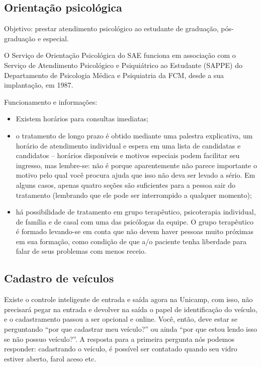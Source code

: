 \subsection{Orientação psicológica}

Objetivo: prestar atendimento psicológico ao estudante de graduação,
pós-graduação e especial.

O Serviço de Orientação Psicológica do SAE funciona em associação com o Serviço
de Atendimento Psicológico e Psiquiátrico ao Estudante (SAPPE) do Departamento
de Psicologia Médica e Psiquiatria da FCM, desde a sua implantação, em 1987.

Funcionamento e informações:

\begin{itemize}
\item Existem horários para consultas imediatas; %

\item o tratamento de longo prazo é obtido mediante uma palestra explicativa,
  um horário de atendimento individual e espera em uma lista de candidatas e
  candidatos -- horários disponíveis e motivos especiais podem facilitar seu
  ingresso, mas lembre-se: não é porque aparentemente não parece importante o
  motivo pelo qual você procura ajuda que isso não deva ser levado a sério. Em
  alguns casos, apenas quatro seções são suficientes para a pessoa sair do
  tratamento (lembrando que ele pode ser interrompido a qualquer momento);

\item há possibilidade de tratamento em grupo terapêutico, psicoterapia
  individual, de família e de casal com uma das psicólogas da equipe. O grupo
  terapêutico é formado levando-se em conta que não devem haver pessoas muito
  próximas em sua formação, como condição de que a/o paciente tenha liberdade
  para falar de seus problemas com menos receio.
\end{itemize}

\subsection{Cadastro de veículos}

Existe o controle inteligente de entrada e saída agora na Unicamp, com isso,
não precisará pegar na entrada e devolver na saída o papel de identificação do
veículo, e o cadastramento passou a ser opcional e online. Você, então, deve
estar se perguntando ``por que cadastrar meu veículo?'' ou ainda ``por que
estou lendo isso se não possuo veículo?''. A resposta para a primeira pergunta
nós podemos responder: cadastrando o veículo, é possível ser contatado quando
seu vidro estiver aberto, farol aceso etc.


